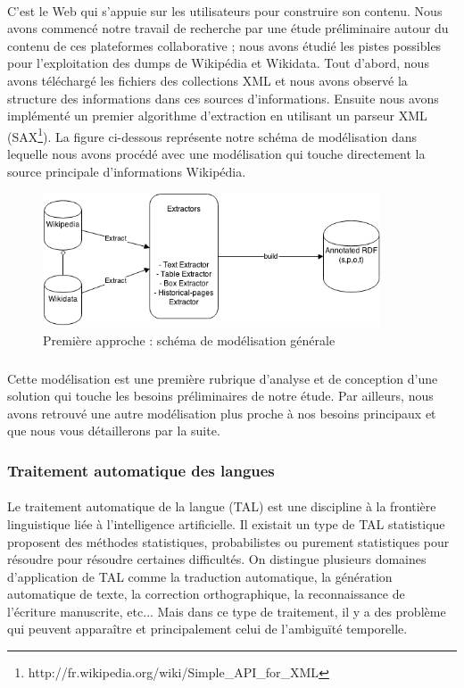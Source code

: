 \documentclass[12pt,a4	]{report}
\begin{document}
\paragraph{}
C'est le Web qui s'appuie sur les utilisateurs pour construire son contenu. Nous avons commencé notre travail de recherche par une étude préliminaire autour du contenu de ces plateformes collaborative ; nous avons étudié les pistes possibles pour l'exploitation des dumps de Wikipédia et Wikidata. Tout d'abord, nous avons téléchargé les fichiers des collections XML et nous avons observé la structure des informations dans ces sources d'informations. Ensuite nous avons implémenté un premier algorithme d'extraction en utilisant un parseur XML (SAX\footnote{http://fr.wikipedia.org/wiki/Simple\_API\_for\_XML}).
La figure ci-dessous représente notre schéma de modélisation dans lequelle nous avons procédé avec une modélisation qui touche directement la source principale d'informations Wikipédia.
\begin{figure}[H]
        \centering
                \centering
                \includegraphics[width=10cm]{modelisation.png}
               \caption{Première approche : schéma de modélisation générale}

\end{figure}
\subparagraph{}
Cette modélisation est une première rubrique d'analyse et de conception d'une solution qui touche les besoins préliminaires de notre étude. Par ailleurs, nous avons retrouvé une autre modélisation plus proche à nos besoins principaux et que nous vous détaillerons par la suite.
\subsubsection*{Traitement automatique des langues}
\paragraph{}
Le traitement automatique de la langue (TAL) est une discipline à la frontière linguistique liée à l'intelligence artificielle.
Il existait un type de TAL statistique proposent des méthodes statistiques, probabilistes ou purement statistiques pour résoudre pour résoudre certaines difficultés.
On distingue plusieurs domaines d'application de TAL comme la traduction automatique, la génération automatique de texte, la correction orthographique, la reconnaissance de l'écriture manuscrite, etc...
Mais dans ce type de traitement, il y a des problème qui peuvent apparaître et principalement celui de l'ambiguïté temporelle.
\end{document}
